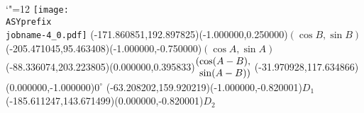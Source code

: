 \setlength{\unitlength}{1pt}
\makeatletter%
\let\ASYencoding\f@encoding%
\let\ASYfamily\f@family%
\let\ASYseries\f@series%
\let\ASYshape\f@shape%
\makeatother%
{\catcode`"=12%
\texttt{[image: \\ASYprefix\\jobname-4\_0.pdf]}%
}%
\color{ASYcolor}
\fontsize{12.000000}{14.400000}\selectfont
\usefont{\ASYencoding}{\ASYfamily}{\ASYseries}{\ASYshape}%
\ASYalign(-171.860851,192.897825)(-1.000000,0.250000){$(\cos B, \sin B)$}%
\color{ASYcolor}
\fontsize{12.000000}{14.400000}\selectfont
\ASYalign(-205.471045,95.463408)(-1.000000,-0.750000){$(\cos A, \sin A)$}%
\color{ASYcolor}
\fontsize{12.000000}{14.400000}\selectfont
\ASYalign(-88.336074,203.223805)(0.000000,0.395833){$\arraycolsep=0pt \begin{array}{rl} (& \cos (A-B), \\ & \sin (A-B)) \end{array}$}%
\color{ASYcolor}
\fontsize{12.000000}{14.400000}\selectfont
\ASYalign(-31.970928,117.634866)(0.000000,-1.000000){$0^\circ$}%
\color{ASYcolor}
\fontsize{12.000000}{14.400000}\selectfont
\ASYalign(-63.208202,159.920219)(-1.000000,-0.820001){$D_1$}%
\color{ASYcolor}
\fontsize{12.000000}{14.400000}\selectfont
\ASYalign(-185.611247,143.671499)(0.000000,-0.820001){$D_2$}%
